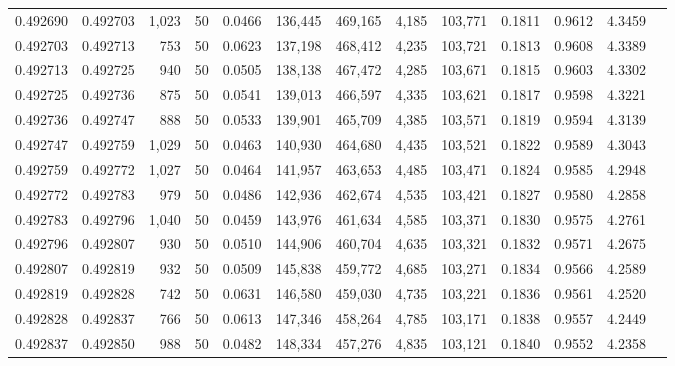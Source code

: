 \begin{tabular}{rrrrrrrrrrrrr}
0.492690 & 0.492703 & 1,023 &  50 &                                     0.0466 & 136,445 & 469,165 &   4,185 & 103,771 & 0.1811 & 0.9612 & 4.3459 \\
0.492703 & 0.492713 &   753 &  50 &                                     0.0623 & 137,198 & 468,412 &   4,235 & 103,721 & 0.1813 & 0.9608 & 4.3389 \\
0.492713 & 0.492725 &   940 &  50 &                                     0.0505 & 138,138 & 467,472 &   4,285 & 103,671 & 0.1815 & 0.9603 & 4.3302 \\
0.492725 & 0.492736 &   875 &  50 &                                     0.0541 & 139,013 & 466,597 &   4,335 & 103,621 & 0.1817 & 0.9598 & 4.3221 \\
0.492736 & 0.492747 &   888 &  50 &                                     0.0533 & 139,901 & 465,709 &   4,385 & 103,571 & 0.1819 & 0.9594 & 4.3139 \\
0.492747 & 0.492759 & 1,029 &  50 &                                     0.0463 & 140,930 & 464,680 &   4,435 & 103,521 & 0.1822 & 0.9589 & 4.3043 \\
0.492759 & 0.492772 & 1,027 &  50 &                                     0.0464 & 141,957 & 463,653 &   4,485 & 103,471 & 0.1824 & 0.9585 & 4.2948 \\
0.492772 & 0.492783 &   979 &  50 &                                     0.0486 & 142,936 & 462,674 &   4,535 & 103,421 & 0.1827 & 0.9580 & 4.2858 \\
0.492783 & 0.492796 & 1,040 &  50 &                                     0.0459 & 143,976 & 461,634 &   4,585 & 103,371 & 0.1830 & 0.9575 & 4.2761 \\
0.492796 & 0.492807 &   930 &  50 &                                     0.0510 & 144,906 & 460,704 &   4,635 & 103,321 & 0.1832 & 0.9571 & 4.2675 \\
0.492807 & 0.492819 &   932 &  50 &                                     0.0509 & 145,838 & 459,772 &   4,685 & 103,271 & 0.1834 & 0.9566 & 4.2589 \\
0.492819 & 0.492828 &   742 &  50 &                                     0.0631 & 146,580 & 459,030 &   4,735 & 103,221 & 0.1836 & 0.9561 & 4.2520 \\
0.492828 & 0.492837 &   766 &  50 &                                     0.0613 & 147,346 & 458,264 &   4,785 & 103,171 & 0.1838 & 0.9557 & 4.2449 \\
0.492837 & 0.492850 &   988 &  50 &                                     0.0482 & 148,334 & 457,276 &   4,835 & 103,121 & 0.1840 & 0.9552 & 4.2358 \\

\end{tabular}
